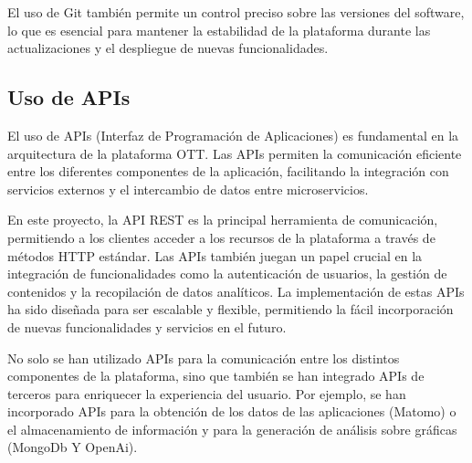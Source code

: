 El uso de Git también permite un control preciso sobre las versiones del software, lo que es esencial para mantener 
la estabilidad de la plataforma durante las actualizaciones y el despliegue de nuevas funcionalidades. 

\subsection{Uso de APIs}
\label{subsec:uso_apis}

El uso de APIs (Interfaz de Programación de Aplicaciones) es fundamental en la arquitectura de la plataforma OTT. 
Las APIs permiten la comunicación eficiente entre los diferentes componentes de la aplicación, facilitando la 
integración con servicios externos y el intercambio de datos entre microservicios.

En este proyecto, la API REST es la principal herramienta de comunicación, permitiendo a los clientes acceder a 
los recursos de la plataforma a través de métodos HTTP estándar. Las APIs también juegan un papel crucial en la 
integración de funcionalidades como la autenticación de usuarios, la gestión de contenidos y la recopilación de 
datos analíticos. La implementación de estas APIs ha sido diseñada para ser escalable y flexible, permitiendo la 
fácil incorporación de nuevas funcionalidades y servicios en el futuro.

No solo se han utilizado APIs para la comunicación entre los distintos componentes de la plataforma, sino que
también se han integrado APIs de terceros para enriquecer la experiencia del usuario. Por ejemplo, se han
incorporado APIs para la obtención de los datos de las aplicaciones (Matomo) o el almacenamiento de información 
y para la generación de análisis sobre gráficas (MongoDb Y OpenAi).